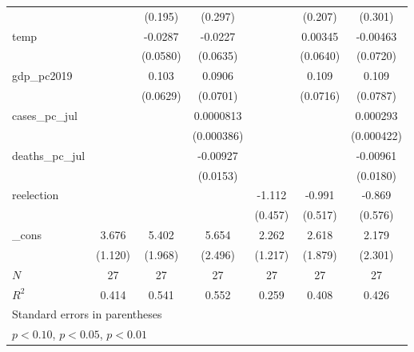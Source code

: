 {\begin{tabular}{l*{6}{c}}
            &                     &     (0.195)         &     (0.297)         &                     &     (0.207)         &     (0.301)         \\
[1em]
temp        &                     &     -0.0287         &     -0.0227         &                     &     0.00345         &    -0.00463         \\
            &                     &    (0.0580)         &    (0.0635)         &                     &    (0.0640)         &    (0.0720)         \\
[1em]
gdp\_pc2019  &                     &       0.103         &      0.0906         &                     &       0.109         &       0.109         \\
            &                     &    (0.0629)         &    (0.0701)         &                     &    (0.0716)         &    (0.0787)         \\
[1em]
cases\_pc\_jul&                     &                     &   0.0000813         &                     &                     &    0.000293         \\
            &                     &                     &  (0.000386)         &                     &                     &  (0.000422)         \\
[1em]
deaths\_pc\_jul&                     &                     &    -0.00927         &                     &                     &    -0.00961         \\
            &                     &                     &    (0.0153)         &                     &                     &    (0.0180)         \\
[1em]
reelection  &                     &                     &                     &      -1.112\sym{**} &      -0.991\sym{*}  &      -0.869         \\
            &                     &                     &                     &     (0.457)         &     (0.517)         &     (0.576)         \\
[1em]
\_cons      &       3.676\sym{***}&       5.402\sym{**} &       5.654\sym{**} &       2.262\sym{*}  &       2.618         &       2.179         \\
            &     (1.120)         &     (1.968)         &     (2.496)         &     (1.217)         &     (1.879)         &     (2.301)         \\
\hline
\(N\)       &          27         &          27         &          27         &          27         &          27         &          27         \\
\(R^{2}\)   &       0.414         &       0.541         &       0.552         &       0.259         &       0.408         &       0.426         \\
\hline\hline
\multicolumn{7}{l}{\footnotesize Standard errors in parentheses}\\
\multicolumn{7}{l}{\footnotesize \sym{*} \(p<0.10\), \sym{**} \(p<0.05\), \sym{***} \(p<0.01\)}\\
\end{tabular}
}
